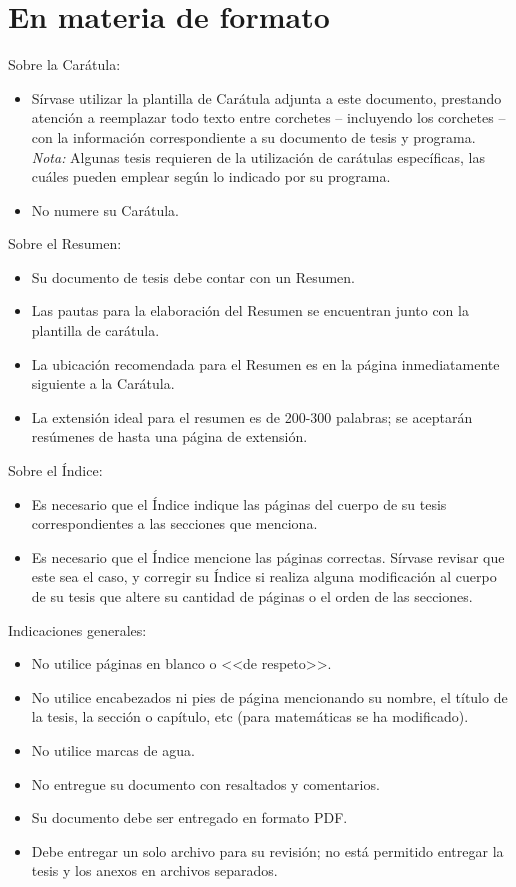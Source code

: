 \section{En materia de formato}%
Sobre la Carátula:
\begin{itemize}
  \item Sírvase utilizar la plantilla de Carátula  adjunta a este documento, prestando atención a reemplazar todo texto entre corchetes -- incluyendo los corchetes -- con la información correspondiente a su documento de tesis y programa. \\
      \emph{Nota:} Algunas tesis requieren de la utilización de carátulas específicas, las cuáles pueden emplear según lo indicado por su programa.
  \item No numere su Carátula.
\end{itemize}
Sobre el Resumen:
\begin{itemize}
  \item Su documento de tesis debe contar con un Resumen.
  \item Las pautas para la elaboración del Resumen se encuentran junto con la plantilla de carátula.
  \item La ubicación recomendada para el Resumen es en la página inmediatamente siguiente a la Carátula.
  \item La extensión ideal para el resumen es de 200-300 palabras; se aceptarán resúmenes de hasta una página de extensión.
\end{itemize}
Sobre el Índice:
\begin{itemize}
  \item Es necesario que el Índice indique las páginas del cuerpo de su tesis correspondientes a las secciones que menciona.
  \item Es necesario que el Índice mencione las páginas correctas. Sírvase revisar que este sea el caso, y corregir su Índice si realiza alguna modificación al cuerpo de su tesis que altere su cantidad de páginas o el orden de las secciones.
\end{itemize}
Indicaciones generales:
\begin{itemize}
  \item No utilice páginas en blanco o <<de respeto>>.
  \item No utilice encabezados ni pies de página mencionando su nombre, el título de la tesis, la sección o capítulo, etc (para matem\'aticas se ha modificado).
  \item No utilice marcas de agua.
  \item No entregue su documento con resaltados y comentarios.
  \item Su documento debe ser entregado en formato PDF.
  \item Debe entregar un solo archivo para su revisión; no está permitido entregar la tesis y los anexos en archivos separados.
\end{itemize}

